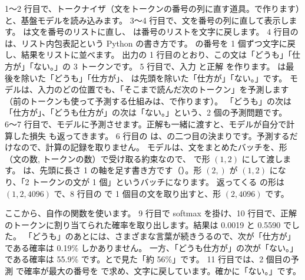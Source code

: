 

1〜2 行目で、トークナイザ（文をトークンの番号の列に直す道具。で作ります）と、基盤モデルを読み込みます。
3〜4 行目で、文を番号の列に直して表示します。
 は文を番号のリストに直し、 は番号のリストを文字に戻します。
4 行目の  は、リスト内包表記という Python の書き方です。 の番号を 1 個ずつ文字に戻し、結果をリストに並べます。
出力の 1 行目のとおり、この文は「どうも」「仕方が」「ない。」の 3 トークンです。
5 行目で、入力  と正解  を作ります。
 は最後を除いた「どうも」「仕方が」、 は先頭を除いた「仕方が」「ない。」です。
モデルは、入力のどの位置でも、「そこまで読んだ次のトークン」を予測します（前のトークンも使って予測する仕組みは、で作ります）。
「どうも」の次は「仕方が」、「どうも仕方が」の次は「ない。」という、2 個の予測問題です。
6〜7 行目で、モデルに予測させます。正解も一緒に渡すと、モデルが自分で計算した損失  も返ってきます。
6 行目の  は、の二つ目の決まりです。予測するだけなので、計算の記録を取りません。
モデルは、文をまとめたバッチを、形（文の数, トークンの数）で受け取る約束なので、 で形 $(1,2)$ にして渡します。
 は、先頭に長さ 1 の軸を足す書き方です（）。形 $(2,)$ が $(1,2)$ になり、「2 トークンの文が 1 個」というバッチになります。
返ってくる  の形は $(1,2,4096)$ で、8 行目の  で 1 個目の文を取り出すと、形 $(2,4096)$ です。

ここから、自作の関数を使います。
9 行目で softmax を掛け、10 行目で、正解のトークンに割り当てられた確率を取り出します。結果は 0.0019 と 0.5590 でした。
「どうも」のあとには、さまざまな言葉が続きうるので、次が「仕方が」である確率は 0.19\% しかありません。
一方、「どうも仕方が」の次が「ない。」である確率は 55.9\% です。とで見た「約 56\%」です。
11 行目では、2 個目の予測  で確率が最大の番号を  で求め、文字に戻しています。確かに「ない。」です。

